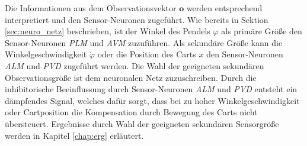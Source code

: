 	Die Informationen aus dem Observationsvektor $\boldsymbol{o}$ werden entsprechend interpretiert und den Sensor-Neuronen zugeführt. Wie bereits in Sektion \ref{sec:neuro_netz} beschrieben, ist der Winkel des Pendels $\varphi$ als primäre Größe den Sensor-Neuronen \textit{PLM} und \textit{AVM} zuzuführen. Als sekundäre Größe kann die Winkelgeschwindigkeit $\dot{\varphi}$ oder die Position des Carts $x$ den Sensor-Neuronen \textit{ALM} und \textit{PVD} zugeführt werden. Die Wahl der geeigneten sekundären Observationsgröße ist dem neuronalen Netz zuzuschreiben. Durch die inhibitorische Beeinflussung durch Sensor-Neuronen \textit{ALM} und \textit{PVD} entsteht ein dämpfendes Signal, welches dafür sorgt, dass bei zu hoher Winkelgeschwindigkeit oder Cartposition die Kompensation durch Bewegung des Carts nicht übersteuert. Ergebnisse durch Wahl der geeigneten sekundären Sensorgröße werden in Kapitel \ref{chap:erg} erläutert.

